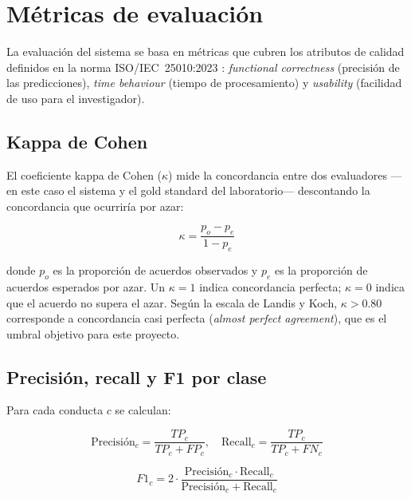 \section{Métricas de evaluación}

La evaluación del sistema se basa en métricas que cubren los atributos de calidad
definidos en la norma ISO/IEC~25010:2023 \cite{iso25010}: \textit{functional
correctness} (precisión de las predicciones), \textit{time behaviour} (tiempo de
procesamiento) y \textit{usability} (facilidad de uso para el investigador).

\subsection{Kappa de Cohen}

El coeficiente kappa de Cohen ($\kappa$) mide la concordancia entre dos evaluadores
---en este caso el sistema y el gold standard del laboratorio--- descontando la
concordancia que ocurriría por azar:

\begin{equation}
    \kappa = \frac{p_o - p_e}{1 - p_e}
    \label{eq:kappa}
\end{equation}

donde $p_o$ es la proporción de acuerdos observados y $p_e$ es la proporción de acuerdos
esperados por azar. Un $\kappa = 1$ indica concordancia perfecta; $\kappa = 0$ indica
que el acuerdo no supera el azar. Según la escala de Landis y Koch, $\kappa > 0.80$
corresponde a concordancia casi perfecta (\textit{almost perfect agreement}), que es el
umbral objetivo para este proyecto.

\subsection{Precisión, recall y F1 por clase}

Para cada conducta $c$ se calculan:

\begin{equation}
    \text{Precisión}_c = \frac{TP_c}{TP_c + FP_c}, \quad
    \text{Recall}_c = \frac{TP_c}{TP_c + FN_c}
    \label{eq:precision_recall}
\end{equation}

\begin{equation}
    F1_c = 2 \cdot \frac{\text{Precisión}_c \cdot \text{Recall}_c}{\text{Precisión}_c + \text{Recall}_c}
    \label{eq:f1}
\end{equation}

